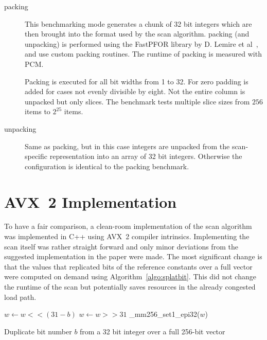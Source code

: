 \begin{description}
\item[packing]
  This benchmarking mode generates a chunk of 32 bit integers which are then
  brought into the format used by the scan algorithm. \simdscan{} packing (and
  unpacking) is performed using the FastPFOR library by D. Lemire et
  al~\cite{fastpfor}, \bwv{} and \bs{} use custom packing routines. The runtime
  of packing is measured with PCM.

  Packing is executed for all bit widths from 1 to 32. For \bs{} zero
  padding is added for cases not evenly divisible by eight. Not the entire
  column is unpacked but only slices. The benchmark tests multiple slice sizes
  from $256$ items to $2^{25}$ items.

\item[unpacking]
  Same as packing, but in this case integers are unpacked from the
  scan-specific representation into an array of 32 bit integers. Otherwise the
  configuration is identical to the packing benchmark.
\end{description}

\section{AVX~2 \bwv{} Implementation}

To have a fair comparison, a clean-room implementation of the \bwv{} scan
algorithm was implemented in C++ using AVX~2 compiler intrinsics. Implementing
the scan itself was rather straight forward and only minor deviations from the
suggested implementation in the paper were made. The most significant change is
that the values that replicated bits of the reference constants over a full
vector were computed on demand using Algorithm~\ref{algo:splatbit}. This did not
change the runtime of the scan but potentially saves resources in the already
congested load path.

\begin{algorithm}[h]
\begin{algorithmic}[1]
  \State $w \gets w << (31-b)$ 
  \State $w \gets w >> 31$ 
  \State \Return \_mm256\_set1\_epi32($w$) 
  \EndProcedure
\end{algorithmic}
\caption{Duplicate bit number $b$ from a 32 bit integer over a
full 256-bit vector}
\label{algo:splatbit}
\end{algorithm}


